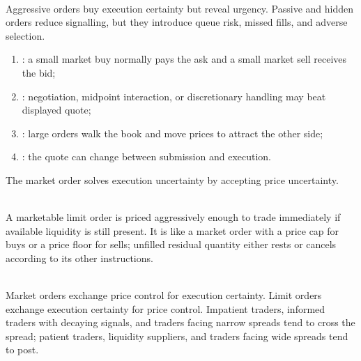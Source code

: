 \begin{principle} \\
Aggressive orders buy execution certainty but reveal urgency. Passive and hidden orders reduce signalling, but they introduce queue risk, missed fills, and adverse selection.
\end{principle}

\begin{mechanism} 
\begin{enumerate}[label=\roman*.]
\setlength{\itemsep}{0pt}
\item {}: a small market buy normally pays the ask and a small market sell receives the bid;
\item {}: negotiation, midpoint interaction, or discretionary handling may beat displayed quote;
\item {}: large orders walk the book and move prices to attract the other side;
\item {}: the quote can change between submission and execution.
\end{enumerate}
The market order solves execution uncertainty by accepting price uncertainty.
\end{mechanism}

\begin{definition} \\
A marketable limit order is priced aggressively enough to trade immediately if available liquidity is still present. It is like a market order with a price cap for buys or a price floor for sells; unfilled residual quantity either rests or cancels according to its other instructions.
\end{definition}

\begin{principle} \\
Market orders exchange price control for execution certainty. Limit orders exchange execution certainty for price control. Impatient traders, informed traders with decaying signals, and traders facing narrow spreads tend to cross the spread; patient traders, liquidity suppliers, and traders facing wide spreads tend to post.
\end{principle}

